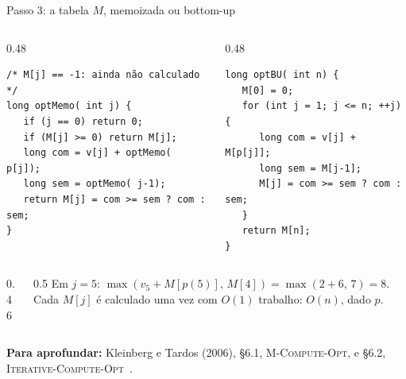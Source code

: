\documentclass[aspectratio=169,xcolor=table]{beamer}
\newcommand{\fonte}[1]{%
  \vfill
  {\tiny\color{gray!55!black}\textbf{Para aprofundar:} #1\par}%
}
\begin{document}
\begin{frame}[fragile]{Passo 3: a tabela $M$, memoizada ou bottom-up}
  \begin{columns}[T]
    \begin{column}{0.48\textwidth}
\begin{lstlisting}
/* M[j] == -1: ainda não calculado */
long optMemo( int j) {
   if (j == 0) return 0;
   if (M[j] >= 0) return M[j];
   long com = v[j] + optMemo( p[j]);
   long sem = optMemo( j-1);
   return M[j] = com >= sem ? com : sem;
}
\end{lstlisting}
    \end{column}
    \begin{column}{0.48\textwidth}
\begin{lstlisting}
long optBU( int n) {
   M[0] = 0;
   for (int j = 1; j <= n; ++j) {
      long com = v[j] + M[p[j]];
      long sem = M[j-1];
      M[j] = com >= sem ? com : sem;
   }
   return M[n];
}
\end{lstlisting}
    \end{column}
  \end{columns}
  \begin{columns}[c]
    \begin{column}{0.46\textwidth}
      \centering
    \end{column}
    \begin{column}{0.5\textwidth}
      \scriptsize Em $j=5$: $\max(v_5 + M[p(5)],\, M[4]) = \max(2+6,\, 7) = 8$.
      Cada $M[j]$ é calculado uma vez com $O(1)$ trabalho: $O(n)$, dado $p$.
    \end{column}
  \end{columns}
  \fonte{Kleinberg e Tardos (2006), \S 6.1, \textsc{M-Compute-Opt}, e \S 6.2,
    \textsc{Iterative-Compute-Opt}~\cite{kleinberg2006algorithm}.}
\end{frame}
\end{document}

